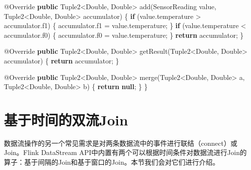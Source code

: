\documentclass[cn,11pt,chinese]{elegantbook}
\newenvironment{Shaded}{}{}
\newcommand{\AttributeTok}[1]{\textcolor[rgb]{0.49,0.56,0.16}{#1}}
\newcommand{\BuiltInTok}[1]{#1}
\newcommand{\FunctionTok}[1]{\textcolor[rgb]{0.02,0.16,0.49}{#1}}
\newcommand{\KeywordTok}[1]{\textcolor[rgb]{0.00,0.44,0.13}{\textbf{#1}}}
\newcommand{\NormalTok}[1]{#1}
\begin{document}
\begin{Shaded}
\begin{Highlighting}[]
    \AttributeTok{@Override}
    \KeywordTok{public}\NormalTok{ Tuple2\textless{}}\BuiltInTok{Double}\NormalTok{, }\BuiltInTok{Double}\NormalTok{\textgreater{} }\FunctionTok{add}\NormalTok{(SensorReading value, Tuple2\textless{}}\BuiltInTok{Double}\NormalTok{, }\BuiltInTok{Double}\NormalTok{\textgreater{} accumulator) \{}
        \KeywordTok{if}\NormalTok{ (value.}\FunctionTok{temperature}\NormalTok{ \textgreater{} accumulator.}\FunctionTok{f1}\NormalTok{) \{}
\NormalTok{            accumulator.}\FunctionTok{f1}\NormalTok{ = value.}\FunctionTok{temperature}\NormalTok{;}
\NormalTok{        \}}
        \KeywordTok{if}\NormalTok{ (value.}\FunctionTok{temperature}\NormalTok{ \textless{} accumulator.}\FunctionTok{f0}\NormalTok{) \{}
\NormalTok{            accumulator.}\FunctionTok{f0}\NormalTok{  = value.}\FunctionTok{temperature}\NormalTok{;}
\NormalTok{        \}}
        \KeywordTok{return}\NormalTok{ accumulator;}
\NormalTok{    \}}

    \AttributeTok{@Override}
    \KeywordTok{public}\NormalTok{ Tuple2\textless{}}\BuiltInTok{Double}\NormalTok{, }\BuiltInTok{Double}\NormalTok{\textgreater{} }\FunctionTok{getResult}\NormalTok{(Tuple2\textless{}}\BuiltInTok{Double}\NormalTok{, }\BuiltInTok{Double}\NormalTok{\textgreater{} accumulator) \{}
        \KeywordTok{return}\NormalTok{ accumulator;}
\NormalTok{    \}}

    \AttributeTok{@Override}
    \KeywordTok{public}\NormalTok{ Tuple2\textless{}}\BuiltInTok{Double}\NormalTok{, }\BuiltInTok{Double}\NormalTok{\textgreater{} }\FunctionTok{merge}\NormalTok{(Tuple2\textless{}}\BuiltInTok{Double}\NormalTok{, }\BuiltInTok{Double}\NormalTok{\textgreater{} a, Tuple2\textless{}}\BuiltInTok{Double}\NormalTok{, }\BuiltInTok{Double}\NormalTok{\textgreater{} b) \{}
        \KeywordTok{return} \KeywordTok{null}\NormalTok{;}
\NormalTok{    \}}
\NormalTok{\}}
\end{Highlighting}
\end{Shaded}

\hypertarget{ux57faux4e8eux65f6ux95f4ux7684ux53ccux6d41join}{%
\section{基于时间的双流Join}\label{ux57faux4e8eux65f6ux95f4ux7684ux53ccux6d41join}}

数据流操作的另一个常见需求是对两条数据流中的事件进行联结（connect）或Join。Flink
DataStream
API中内置有两个可以根据时间条件对数据流进行Join的算子：基于间隔的Join和基于窗口的Join。本节我们会对它们进行介绍。
\end{document}
